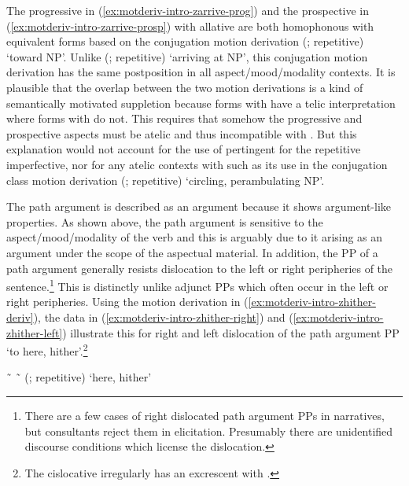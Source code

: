 \documentclass[12pt,letterpaper,oneside,article]{memoir}
\begin{document}
The progressive in (\ref{ex:motderiv-intro-zarrive-prog}) and the prospective in (\ref{ex:motderiv-intro-zarrive-prosp}) with allative  are both homophonous with equivalent forms based on the  conjugation motion derivation  (;  repetitive) ‘toward NP’.
Unlike  (;  repetitive) ‘arriving at NP’, this  conjugation motion derivation has the same postposition in all aspect/mood/modality contexts.
It is plausible that the overlap between the two motion derivations is a kind of semantically motivated suppletion because forms with  have a telic interpretation where forms with  do not.
This requires that somehow the progressive and prospective aspects must be atelic and thus incompatible with .
But this explanation would not account for the use of pertingent  for the repetitive imperfective, nor for any atelic contexts with  such as its use in the  conjugation class motion derivation  (;  repetitive) ‘circling, perambulating NP’.

The path argument is described as an argument because it shows argument-like properties.
As shown above, the path argument is sensitive to the aspect/mood/modality of the verb and this is arguably due to it arising as an argument under the scope of the aspectual material.
In addition, the PP of a path argument generally resists dislocation to the left or right peripheries of the sentence.\footnote{There are a few cases of right dislocated path argument PPs in narratives, but consultants reject them in elicitation.
Presumably there are unidentified discourse conditions which license the dislocation.}
This is distinctly unlike adjunct PPs which often occur in the left or right peripheries.
Using the motion derivation in (\ref{ex:motderiv-intro-zhither-deriv}), the data in (\ref{ex:motderiv-intro-zhither-right}) and (\ref{ex:motderiv-intro-zhither-left}) illustrate this for right and left dislocation of the path argument PP  ‘to here, hither’.\footnote{The cislocative  irregularly has an excrescent  with .}

\ex\label{ex:motderiv-intro-zhither-deriv}%
%
	 \~\  \~\  (;  repetitive) ‘here, hither’
\xe
\end{document}
